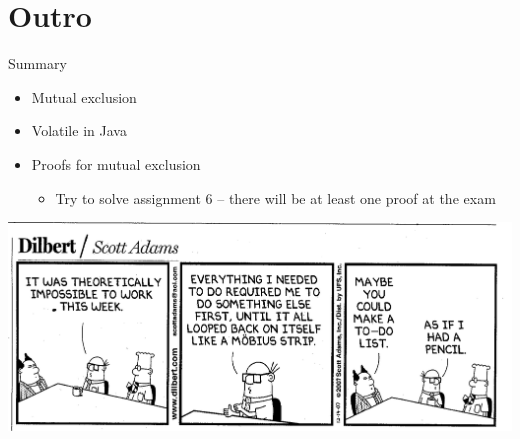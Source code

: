 \section*{Outro}

\begin{frame}{Summary}
  \begin{itemize}
  \item Mutual exclusion
  \item Volatile in Java
  \item Proofs for mutual exclusion
    \begin{itemize}
    \item Try to solve assignment 6 -- there will be at least one
      proof at the exam
    \end{itemize}
  \end{itemize}

  
  \begin{center}
    \includegraphics[scale=0.18]{figures/dilbert}
  \end{center}
\end{frame}


